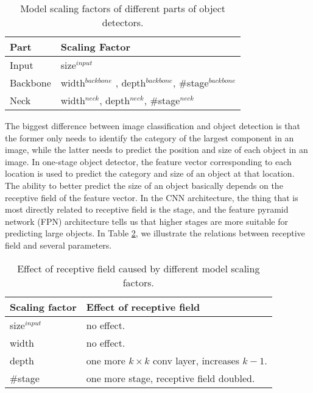 \documentclass[10pt,twocolumn,letterpaper]{article}
\begin{document}
\begin{table}[h]
	\centering
	\begin{threeparttable}[h]
		\footnotesize
		\caption{Model scaling factors of different parts of object detectors.}
		\label{table:t7}
		\setlength\tabcolsep{3.5pt}
		\begin{tabular}{ll}
			\toprule
			\textbf{Part} & \textbf{Scaling Factor} \\				
			\midrule
			Input & size$^{input}$ \\
			Backbone & width$^{backbone}$ , depth$^{backbone}$, \#stage$^{backbone}$ \\
			Neck & width$^{neck}$, depth$^{neck}$, \#stage$^{neck}$  \\
			\bottomrule
		\end{tabular}
	\end{threeparttable}
\end{table}

The biggest difference between image classification and object detection is that the former only needs to identify the category of the largest component in an image, while the latter needs to predict the position and size of each object in an image.  In one-stage object detector, the feature vector corresponding to each location is used to predict the category and size of an object at that location.  The ability to better predict the size of an object basically depends on the receptive field of the feature vector.  In the CNN architecture, the thing that is most directly related to receptive field is the stage, and the feature pyramid network (FPN) architecture tells us that higher stages are more suitable for predicting large objects.  In Table \ref{table:t8}, we illustrate the relations between receptive field and several parameters.

\begin{table}[h]
	\centering
	\begin{threeparttable}[h]
		\footnotesize
		\caption{Effect of receptive field caused by different model scaling factors.}
		\label{table:t8}
		\setlength\tabcolsep{3.5pt}
		\begin{tabular}{ll}
			\toprule
			\textbf{Scaling factor} & \textbf{Effect of receptive field} \\				
			\midrule
			size$^{input}$ & no effect. \\
			width & no effect. \\
			depth & one more $k \times k$ conv layer, increases $k-1$. \\
			\#stage & one more stage, receptive field doubled. \\
			\bottomrule
		\end{tabular}
	\end{threeparttable}
\end{table}
\end{document}
